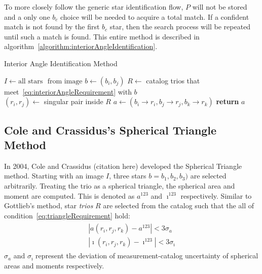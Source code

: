 To more closely follow the generic star identification flow, $P$ will not be stored and a only one $b_c$ choice will be
needed to acquire a total match. If a confident match is not found by the first $b_c$ star, then the search process
will be repeated until such a match is found. This entire method is described in
algorithm~\autoref{algorithm:interiorAngleIdentification}.

\begin{algorithm}
    \caption{Interior Angle Identification Method} \label{algorithm:interiorAngleIdentification}
    \begin{algorithmic}[1]
        \State $I \gets \text{all stars } \text{ from image}$
        \State $b \gets (b_i, b_j)$
        \State $R \gets $ catalog trios that meet~\eqref{eq:interiorAngleRequirement} with $b$
        \\
        \State $(r_i, r_j) \gets $ singular pair inside $R$
        \State $a \gets (b_i \rightarrow r_i, b_j \rightarrow r_j, b_k \rightarrow r_k)$
        \State \textbf{return} $a$
        \EndIf
        \EndFor
        \EndFor
        \EndFor
        \EndProcedure
    \end{algorithmic}
\end{algorithm}

\subsection{Cole and Crassidus's Spherical Triangle Method}\label{subsec:coleAndCrassidus'sSphericalTriangleMethod}
In 2004, Cole and Crassidus (citation here) developed the Spherical Triangle method. Starting with an image $I$, three
stars $b = b_1, b_2, b_3)$ are selected arbitrarily. Treating the trio as a spherical triangle, the spherical area and
moment are computed. This is denoted as $a^{123}$ and $\imath^{123}$ respectively. Similar to Gottlieb's method, star
\textit{trios} $R$ are selected from the catalog such that the all of condition~\eqref{eq:triangleRequirement} hold:
\begin{align}
    \begin{split}
        \label{eq:triangleRequirement}
        | a(r_i, r_j, r_k) - a^{123} | < 3 \sigma_a
        \\
        | \imath(r_i, r_j, r_k) - \imath^{123} | < 3\sigma_{\imath}
    \end{split}
\end{align}
$\sigma_a$ and $\sigma_{\imath}$ represent the deviation of measurement-catalog uncertainty of spherical areas and
moments respectively.

